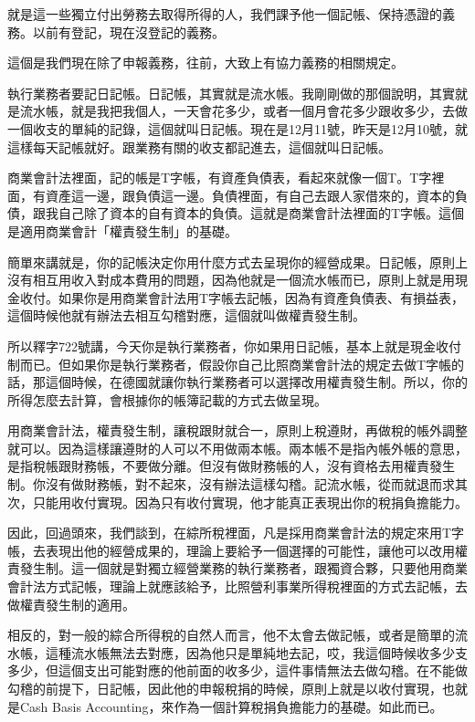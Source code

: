 \documentclass[]{ctexbook}
\begin{document}
就是這一些獨立付出勞務去取得所得的人，我們課予他一個記帳、保持憑證的義務。以前有登記，現在沒登記的義務。

這個是我們現在除了申報義務，往前，大致上有協力義務的相關規定。

執行業務者要記日記帳。日記帳，其實就是流水帳。我剛剛做的那個說明，其實就是流水帳，就是我把我個人，一天會花多少，或者一個月會花多少跟收多少，去做一個收支的單純的記錄，這個就叫日記帳。現在是12月11號，昨天是12月10號，就這樣每天記帳就好。跟業務有關的收支都記進去，這個就叫日記帳。

商業會計法裡面，記的帳是T字帳，有資產負債表，看起來就像一個T。T字裡面，有資產這一邊，跟負債這一邊。負債裡面，有自己去跟人家借來的，資本的負債，跟我自己除了資本的自有資本的負債。這就是商業會計法裡面的T字帳。這個是適用商業會計「權責發生制」的基礎。

簡單來講就是，你的記帳決定你用什麼方式去呈現你的經營成果。日記帳，原則上沒有相互用收入對成本費用的問題，因為他就是一個流水帳而已，原則上就是用現金收付。如果你是用商業會計法用T字帳去記帳，因為有資產負債表、有損益表，這個時候他就有辦法去相互勾稽對應，這個就叫做權責發生制。

所以釋字722號講，今天你是執行業務者，你如果用日記帳，基本上就是現金收付制而已。但如果你是執行業務者，假設你自己比照商業會計法的規定去做T字帳的話，那這個時候，在德國就讓你執行業務者可以選擇改用權責發生制。所以，你的所得怎麼去計算，會根據你的帳簿記載的方式去做呈現。

用商業會計法，權責發生制，讓稅跟財就合一，原則上稅遵財，再做稅的帳外調整就可以。因為這樣讓遵財的人可以不用做兩本帳。兩本帳不是指內帳外帳的意思，是指稅帳跟財務帳，不要做分離。但沒有做財務帳的人，沒有資格去用權責發生制。你沒有做財務帳，對不起來，沒有辦法這樣勾稽。記流水帳，從而就退而求其次，只能用收付實現。因為只有收付實現，他才能真正表現出你的稅捐負擔能力。

因此，回過頭來，我們談到，在綜所稅裡面，凡是採用商業會計法的規定來用T字帳，去表現出他的經營成果的，理論上要給予一個選擇的可能性，讓他可以改用權責發生制。這一個就是對獨立經營業務的執行業務者，跟獨資合夥，只要他用商業會計法方式記帳，理論上就應該給予，比照營利事業所得稅裡面的方式去記帳，去做權責發生制的適用。

相反的，對一般的綜合所得稅的自然人而言，他不太會去做記帳，或者是簡單的流水帳，這種流水帳無法去對應，因為他只是單純地去記，哎，我這個時候收多少支多少，但這個支出可能對應的他前面的收多少，這件事情無法去做勾稽。在不能做勾稽的前提下，日記帳，因此他的申報稅捐的時候，原則上就是以收付實現，也就是Cash Basis Accounting，來作為一個計算稅捐負擔能力的基礎。如此而已。
\end{document}

